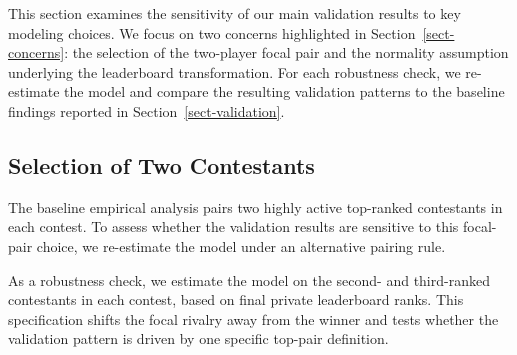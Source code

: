 \documentclass[mnsc]{informs3}
\begin{document}
This section examines the sensitivity of our main validation results to key modeling choices.
We focus on two concerns highlighted in Section~\ref{sect-concerns}: the selection of the two-player focal pair and the normality assumption underlying the leaderboard transformation. For each robustness check, we re-estimate the model and compare the resulting validation patterns to the baseline findings reported in Section~\ref{sect-validation}.

\subsection{Selection of Two Contestants}\label{sect-robust-2players}

The baseline empirical analysis pairs two highly active top-ranked contestants in each contest.
To assess whether the validation results are sensitive to this focal-pair choice, we re-estimate the model under an alternative pairing rule.

As a robustness check, we estimate the model on the second- and third-ranked contestants in each contest, based on final private leaderboard ranks.
This specification shifts the focal rivalry away from the winner and tests whether the validation pattern is driven by one specific top-pair definition.
\end{document}
